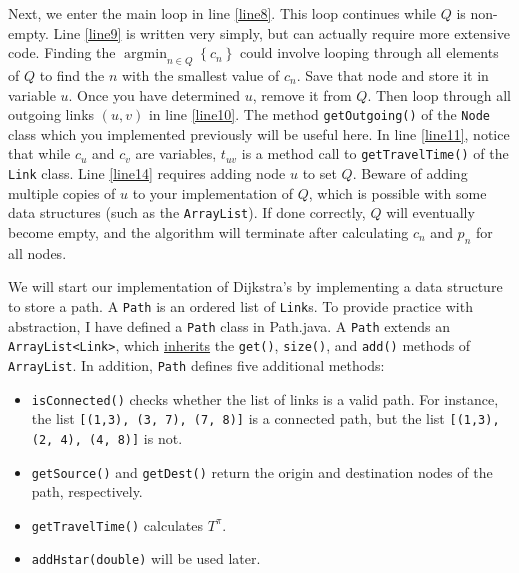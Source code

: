\documentclass[11pt]{article}
\DeclareMathOperator*{\argmin}{\arg\min}
\begin{document}
Next, we enter the main loop in line \ref{line8}. This loop continues while $Q$ is non-empty. Line \ref{line9} is written very simply, but can actually require more extensive code. Finding the $\argmin_{n\in Q} \left\{c_n\right\}$ could involve looping through all elements of $Q$ to find the $n$ with the smallest value of $c_n$. Save that node and store it in variable $u$. Once you have determined $u$, remove it from $Q$. Then loop through all outgoing links $(u,v)$ in line \ref{line10}. The method \texttt{getOutgoing()} of the \texttt{Node} class which you implemented previously will be useful here. In line \ref{line11}, notice that while $c_u$ and $c_v$ are variables, $t_{uv}$ is a method call to \texttt{getTravelTime()} of the \texttt{Link} class. Line \ref{line14} requires adding node $u$ to set $Q$. Beware of adding multiple copies of $u$ to your implementation of $Q$, which is possible with some data structures (such as the \texttt{ArrayList}). If done correctly, $Q$ will eventually become empty, and the algorithm will terminate after calculating $c_n$ and $p_n$ for all nodes. 






We will start our implementation of Dijkstra's by implementing a data structure to store a path. 
A \texttt{Path} is an ordered list of \texttt{Link}s. To provide practice with abstraction, I have defined a \texttt{Path} class in Path.java. A \texttt{Path} extends an \texttt{ArrayList<Link>}, which \href{https://www.w3schools.com/java/java_inheritance.asp}{inherits} the \texttt{get()}, \texttt{size()}, and \texttt{add()} methods of \texttt{ArrayList}. In addition, \texttt{Path} defines five additional methods:
\begin{itemize}
	\item \texttt{isConnected()} checks whether the list of links is a valid path. For instance, the list \texttt{[(1,3), (3, 7), (7, 8)]} is a connected path, but the list \texttt{[(1,3), (2, 4), (4, 8)]} is not.
	\item  \texttt{getSource()} and \texttt{getDest()} return the origin and destination nodes of the path, respectively.
	\item \texttt{getTravelTime()} calculates $T^\pi$.
	\item \texttt{addHstar(double)} will be used later.
\end{itemize}
\end{document}
